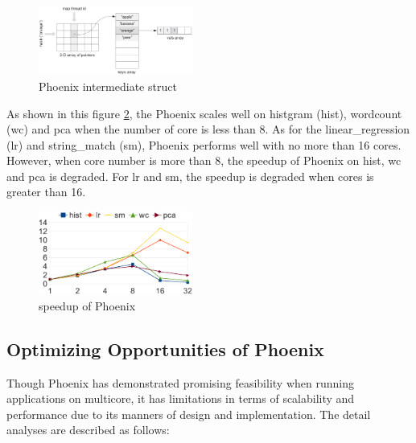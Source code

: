 \begin{figure}[!h!t]  
    \centering
    \includegraphics[width=0.45\textwidth]{eps/phoenix_intermediate.eps}
    \caption{Phoenix intermediate struct}
    \label{fig:phoenix:intermediate}
\end{figure}
As shown in this figure \ref{fig:phoenix:speedup}, 
the Phoenix scales well on histgram (hist), wordcount (wc) and pca when the number of core is less than 8.
As for the linear\_regression (lr) and string\_match (sm), 
Phoenix performs well with no more than 16 cores.
However, when core number is more than  8, 
the speedup of Phoenix  on hist,  wc and pca is degraded.
For lr and sm, the speedup is degraded when cores is greater than 16.



\begin{figure}[!h!t]  
    \centering
    \includegraphics[width=0.45\textwidth]{eps/phoenix_speedup.eps}
    \caption{speedup of Phoenix}
    \label{fig:phoenix:speedup}
\end{figure}


\subsection{Optimizing Opportunities of Phoenix}
Though Phoenix has demonstrated promising feasibility when running  applications on multicore,  it has limitations in terms of scalability and performance due to its manners of design and implementation.
The detail analyses are described as follows:

